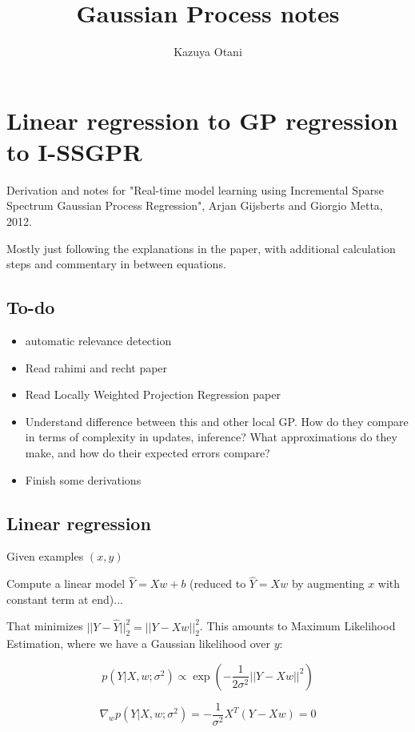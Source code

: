 \documentclass[a4paper]{article}
\title{Gaussian Process notes}
\author{Kazuya Otani}
\begin{document}
\maketitle

\section{Linear regression to GP regression to I-SSGPR}

Derivation and notes for "Real-time model learning using Incremental Sparse Spectrum Gaussian Process Regression", Arjan Gijsberts and Giorgio Metta, 2012.

Mostly just following the explanations in the paper, with additional calculation steps and commentary in between equations.

\subsection*{To-do}

\begin{itemize}
	\item automatic relevance detection
    \item Read rahimi and recht paper
    \item Read Locally Weighted Projection Regression paper
    \item Understand difference between this and other local GP. How do they compare in terms of complexity in updates, inference? What approximations do they make, and how do their expected errors compare?
    \item Finish some derivations 
\end{itemize}

\subsection{Linear regression}

Given examples $(x,y)$

Compute a linear model $\hat{Y}=Xw+b$ (reduced to $\hat{Y}=Xw$ by augmenting $x$ with constant term at end)... 

That minimizes $||Y - \hat{Y}||_2^2 = ||Y - X w||_2^2$. This amounts to Maximum Likelihood Estimation, where we have a Gaussian likelihood over $y$:

$$p(Y|X,w;\sigma^2) \propto \exp(-\frac{1}{2\sigma^2} ||Y-Xw||^2)$$

$$\nabla_w p(Y|X,w; \sigma^2) = -\frac{1}{\sigma^2} X^T(Y-Xw)=0$$
\end{document}
